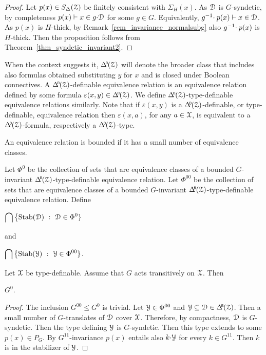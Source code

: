 \begin{proof}
  Let $p(x)\in S_\Delta(\EuScript Z)$ be finitely consistent with $\Sigma_H(x)$.
  As $\EuScript D$ is $G$-syndetic, by completeness $p(x)\vdash x\in g{\cdot}\EuScript D$ for some $g\in G$.
  Equivalently, $g^{-1}\kern-.5ex\cdot p(x)\vdash x\in\EuScript D$.
  As $p(x)$ is $H$-thick, by Remark~\ref{rem_invariance_normalsubg} also $g^{-1}\kern-.5ex\cdot p(x)$ is $H$-thick.
  Then the proposition follows from Theorem~\ref{thm_syndetic_invariant2}.
\end{proof}

When the context suggests it, $\BDelta(\Z)$ will denote the broader class that includes also formulas obtained substituting $y$ for $x$ and is closed under Boolean connectives.
A $\BDelta(\Z)$-definable equivalence relation is an equivalence relation defined by some formula $\varepsilon(x,y)\in\BDelta(\Z)$.
We define $\BDelta(\Z)$-type-definable equivalence relations similarly.
Note that if $\varepsilon(x,y)$ is a $\BDelta(\Z)$-definable, or type-definable, equivalence relation then $\varepsilon(x,a)$, for any $a\in\EuScript X$, is equivalent to a $\BDelta(\Z)$-formula, respectively a $\BDelta(\Z)$-type.

An equivalence relation is bounded if it has a small number of equivalence classes.

\begin{definition}\label{def_G00}
  Let $\Phi^0$ be the collection of sets that are equivalence classes of a bounded $G$-invariant $\BDelta(\Z)$-type-definable equivalence relation.
  Let $\Phi^{00}$ be the collection of sets that are equivalence classes of a bounded $G$-invariant $\BDelta(\Z)$-type-definable equivalence relation.
  Define
  \smallskip

  \medrel{=}$\displaystyle\bigcap\big\{{\rm Stab}(\D)\ :\  \D\in\Phi^0\}$

  and

  \medrel{=}$\displaystyle\bigcap\big\{{\rm Stab}(\Y)\ :\  \Y\in\Phi^{00}\}$.

\end{definition}

\begin{proposition}
  Let $\EuScript X$ be type-definable.
  Assume that $G$ acts transitively on $\EuScript X$.
  Then 
  
  \medrel{\leq}$G^0$.
\end{proposition}

\begin{proof}
  The inclusion $G^{00}\leq G^0$ is trivial.
  Let $\EuScript Y\in\Phi^{00}$ and $\Y\subseteq\D\in\BDelta(\Z)$.
  Then a small number of $G$-translates of $\EuScript D$ cover $\EuScript X$.
  Therefore, by compactness, $\EuScript D$ is $G$-syndetic.
  Then the type defining $\EuScript Y$ is $G$-syndetic.
  Then this type extends to some $p(x)\in P_G$.
  By $G^{1\!1}$-in\-variance $p(x)$ entails also $k{\cdot}\EuScript Y$ for every $k\in G^{1\!1}$.
  Then $k$ is in the stabilizer of $\EuScript Y$.
\end{proof}



